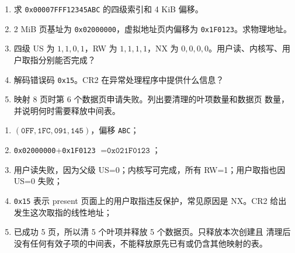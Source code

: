 
\begin{enumerate}[leftmargin=2.2em]
  \item 求 \texttt{0x00007FFF12345ABC} 的四级索引和 4 KiB 偏移。
  \item 2 MiB 页基址为 \texttt{0x02000000}，虚拟地址页内偏移为
    \texttt{0x1F0123}。求物理地址。
  \item 四级 US 为 \(1,1,0,1\)，RW 为 \(1,1,1,1\)，NX 为
    \(0,0,0,0\)。用户读、内核写、用户取指分别能否完成？
  \item 解码错误码 \texttt{0x15}。CR2 在异常处理程序中提供什么信息？
  \item 映射 8 页时第 6 个数据页申请失败。列出要清理的叶项数量和数据页
    数量，并说明何时需要释放中间表。
\end{enumerate}

\begin{answerbox}
\begin{enumerate}[leftmargin=2.2em]
  \item \((\texttt{0FF},\texttt{1FC},\texttt{091},
    \texttt{145})\)，偏移 \texttt{ABC}；
  \item \texttt{0x02000000}+\texttt{0x1F0123}
    \(=\texttt{0x021F0123}\)；
  \item 用户读失败，因为父级 US=0；内核写可完成，所有 RW=1；用户取指也因
    US=0 失败；
  \item \texttt{0x15} 表示 present 页面上的用户取指违反保护，常见原因是
    NX。CR2 给出发生这次取指的线性地址；
  \item 已成功 5 页，所以清 5 个叶项并释放 5 个数据页。只释放本次创建且
    清理后没有任何有效子项的中间表，不能释放原先已有或仍含其他映射的表。
\end{enumerate}
\end{answerbox}
